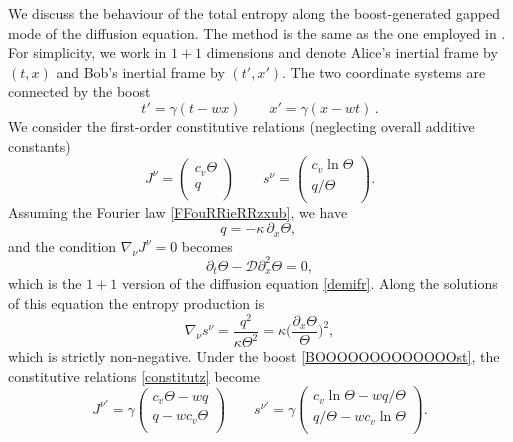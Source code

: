 \documentclass[a4paper, amsfonts, amssymb, amsmath, reprint, twocolumn, showkeys, nofootinbib]{revtex4-2}
\begin{document}
We discuss the behaviour of the total entropy along the boost-generated gapped mode of the diffusion equation. The method is the same as the one employed in \citet{GavassinoLyapunov_2020}.
For simplicity, we work in $1+1$ dimensions and denote Alice's inertial frame by $(t,x)$ and Bob's inertial frame by $(t',x')$. The two coordinate systems are connected by the boost
\begin{equation}\label{BOOOOOOOOOOOOOst}
t' = \gamma(t-wx)   \quad \quad    x' = \gamma (x-wt) \, .
\end{equation}
We consider the first-order constitutive relations (neglecting overall additive constants)
\begin{equation}\label{constitutz}
J^\nu=
\left( \begin{matrix}
   c_v \Theta  \\
 q \\
\end{matrix} \right)
 \quad \quad  
s^\nu=
\left( \begin{matrix}
   c_v \ln \Theta  \\
 q/\Theta \\
\end{matrix} \right).
\end{equation}
Assuming the Fourier law \eqref{FFouRRieRRzxub}, we have
\begin{equation}
q=-\kappa \, \partial_x \Theta, \, 
\end{equation}
and the condition $\nabla_\nu J^\nu=0$ becomes
\begin{equation}
\partial_t \Theta - \mathcal{D} \partial_x^2 \Theta =0,
\end{equation}
which is the $1+1$ version of the diffusion equation \eqref{demifr}. 
Along the solutions of this equation the entropy production is
\begin{equation}\label{parunziov}
\nabla_\nu s^\nu = \dfrac{q^2}{\kappa \Theta^2} = \kappa \bigg( \dfrac{\partial_x \Theta}{\Theta}  \bigg)^2 ,
\end{equation}
which is strictly non-negative. 
Under the boost \eqref{BOOOOOOOOOOOOOst}, the constitutive relations \eqref{constitutz} become
\begin{equation}
J^{\nu'}= \gamma 
\left( \begin{matrix}
    c_v \Theta -w q  \\
 q - w c_v \Theta \\
\end{matrix} \right)
 \quad \quad  
s^{\nu'}= \gamma
\left( \begin{matrix}
   c_v \ln \Theta -w q/\Theta  \\
 q/\Theta - w c_v \ln \Theta  \\
\end{matrix} \right).
\end{equation}
\end{document}
